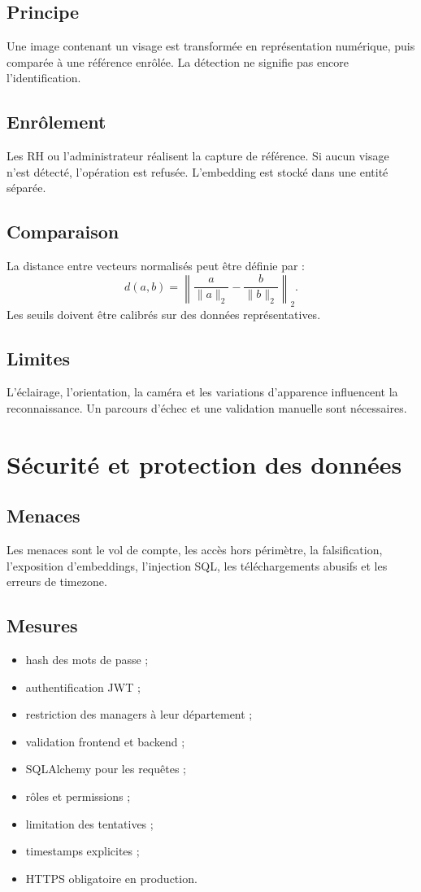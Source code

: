 \documentclass[11pt,a4paper,oneside]{report}
\begin{document}
\section{Principe}
Une image contenant un visage est transformée en représentation numérique, puis comparée à une référence enrôlée. La détection ne signifie pas encore l'identification.
\section{Enrôlement}
Les RH ou l'administrateur réalisent la capture de référence. Si aucun visage n'est détecté, l'opération est refusée. L'embedding est stocké dans une entité séparée.
\section{Comparaison}
La distance entre vecteurs normalisés peut être définie par :
\[
d(a,b)=\left\|\frac{a}{\|a\|_2}-\frac{b}{\|b\|_2}\right\|_2.
\]
Les seuils doivent être calibrés sur des données représentatives.
\section{Limites}
L'éclairage, l'orientation, la caméra et les variations d'apparence influencent la reconnaissance. Un parcours d'échec et une validation manuelle sont nécessaires.

\chapter{Sécurité et protection des données}
\section{Menaces}
Les menaces sont le vol de compte, les accès hors périmètre, la falsification, l'exposition d'embeddings, l'injection SQL, les téléchargements abusifs et les erreurs de timezone.
\section{Mesures}
\begin{itemize}
\item hash des mots de passe ;
\item authentification JWT ;
\item restriction des managers à leur département ;
\item validation frontend et backend ;
\item SQLAlchemy pour les requêtes ;
\item rôles et permissions ;
\item limitation des tentatives ;
\item timestamps explicites ;
\item HTTPS obligatoire en production.
\end{itemize}
\end{document}
